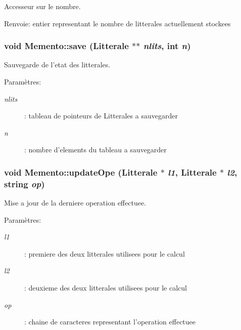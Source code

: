 Accesseur sur le nombre. 

\begin{Desc}
\item[Renvoie:]entier representant le nombre de litterales actuellement stockees \end{Desc}
\hypertarget{class_memento_3b5cc6cc4611bb18ea52ef949f7b9430}{
\subsubsection[{save}]{\setlength{\rightskip}{0pt plus 5cm}void Memento::save ({\bf Litterale} $\ast$$\ast$ {\em nlits}, \/  int {\em n})}}
\label{class_memento_3b5cc6cc4611bb18ea52ef949f7b9430}


Sauvegarde de l'etat des litterales. 

\begin{Desc}
\item[Paramètres:]
\begin{description}
\item[{\em nlits}]: tableau de pointeurs de Litterales a sauvegarder \item[{\em n}]: nombre d'elements du tableau a sauvegarder \end{description}
\end{Desc}
\hypertarget{class_memento_f8f177a9c75011e284897fc5febb14a0}{
\subsubsection[{updateOpe}]{\setlength{\rightskip}{0pt plus 5cm}void Memento::updateOpe ({\bf Litterale} $\ast$ {\em l1}, \/  {\bf Litterale} $\ast$ {\em l2}, \/  string {\em op})}}
\label{class_memento_f8f177a9c75011e284897fc5febb14a0}


Mise a jour de la derniere operation effectuee. 

\begin{Desc}
\item[Paramètres:]
\begin{description}
\item[{\em l1}]: premiere des deux litterales utilisees pour le calcul \item[{\em l2}]: deuxieme des deux litterales utilisees pour le calcul \item[{\em op}]: chaine de caracteres representant l'operation effectuee \end{description}
\end{Desc}


